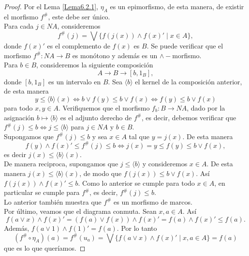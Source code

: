 \begin{proof}
    Por el Lema \ref{Lema6.2.1}, $\eta_A$ es un epimorfismo, de esta manera, de existir el morfismo $f^\#$, este debe ser único.\\

    Para cada $j\in NA$, consideremos 
    \[
    f^\#(j)=\bigvee\{f(j(x))\wedge f(x)'\mid x\in A\},
    \]
    donde $f(x)'$ es el complemento de $f(x)$ es $B$. Se puede verificar que el morfismo $f^\#\colon NA\to B$ es monótono y además es un $\wedge-$morfismo.\\

    Para $b\in B$, consideremos la siguiente composición
    \[
    A\to B\to [b,1_B],
    \]
    donde $[b, 1_B]$ es un intervalo en $B$. Sea $\langle b\rangle$ el kernel de la composición anterior, de esta manera
    \[
    y\leq \langle b\rangle(x)\Leftrightarrow b\vee f(y)\leq b\vee f(x)\Leftrightarrow f(y)\leq b\vee f(x)
    \]
    para todo $x,y\in A$. Verifiquemos que el morfismo $f_b\colon B\to NA$, dado por la asignación $b\mapsto \langle b\rangle$ es el adjunto derecho de $f^\#$, es decir, debemos verificar que $f^\#(j)\leq b\Leftrightarrow j\leq \langle b\rangle$ para $j\in NA$ y $b\in B$.\\

    Supongamos que $f^\#(j)\leq b$ y sea $x\in A$ tal que $y=j(x)$. De esta manera
    \[
    f(y)\wedge f(x)'\leq f^\#(j)\leq b\Leftrightarrow j(x)=y\leq f(y)\leq b\vee f(x),
    \]
    es decir $j(x)\leq \langle b\rangle(x)$.\\

    De manera reciproca, supongamos que $j\leq \langle b\rangle$ y consideremos $x\in A$. De esta manera $j(x)\leq \langle b\rangle(x)$, de modo que $f(j(x))\leq b\vee f(x)$. Así $f(j(x))\wedge f(x)'\leq b$. Como lo anterior se cumple para todo $x\in A$, en particular se cumple para $f^\#$, es decir, $f^\#(j)\leq b$.\\

    Lo anterior también muestra que $f^\#$ es un morfismo de marcos.\\

    Por último, veamos que el diagrama conmuta. Sean $x, a\in A.$ Así
    \[
    f(a\vee x)\wedge f(x)'=(f(a)\vee f(x))\wedge f(x)'=f(a)\wedge f(x)'\leq f(a).
    \]
    Además, $f(a\vee 1)\wedge f(1)'=f(a)$. Por lo tanto 
    \[
    (f^\#\circ \eta_A)(a)=f^\#(u_a)=\bigvee\{f(a\vee x)\wedge f(x)'\mid x, a\in A\}=f(a)
    \]
    que es lo que queríamos.
\end{proof}

